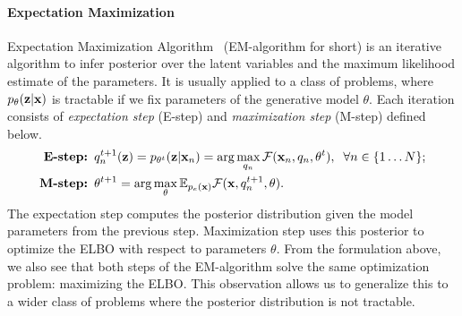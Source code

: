 \paragraph{Expectation Maximization}
Expectation Maximization Algorithm~\citep{dempster1977maximum} (EM-algorithm for short) is an iterative algorithm to infer posterior over the latent variables and the maximum likelihood estimate of the parameters.
It is usually applied to a class of problems, where $p_{\theta}({\mathbf{z}}|{\mathbf{x}})$ is tractable if we fix parameters of the generative model $\theta$. Each iteration consists of \textit{expectation step} (E-step) and \textit{maximization step} (M-step) defined below.
\begin{equation}
\begin{aligned}
    \text{\textbf{E-step:  }} &q^{t+1}_n({\mathbf{z}}) = p_{\theta^t}({\mathbf{z}}|{\mathbf{x}}_n) = \arg\max_{q_n} \mathcal{F}({\mathbf{x}}_n, q_n, \theta^t),\;\;\forall n \in \{1\dots N\};\\
    \text{\textbf{M-step:  }} &\theta^{t+1} = \arg\max_{\theta} \mathbb{E}_{p_e({\mathbf{x}})}\mathcal{F}({\mathbf{x}}, q^{t+1}_n, \theta).\\
\end{aligned}
\end{equation}
The expectation step computes the posterior distribution given the model parameters from the previous step. Maximization step uses this posterior to optimize the ELBO with respect to parameters $\theta$. From the formulation above, we also see that both steps of the EM-algorithm solve the same optimization problem: maximizing the ELBO.  This observation allows us to generalize this to a wider class of problems where the posterior distribution is not tractable. 

